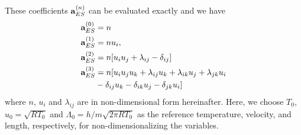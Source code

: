 \documentclass[doublecol]{epl2}
\begin{document}
These coefficients ${\bf a}^{(n)}_{ES}$ can be evaluated exactly and we have
\begin{subequations}
\begin{align}
{\bf a}_{ES}^{(0)} &= n \\ %
{\bf a}_{ES}^{(1)} &= n u_{i},  \\
{\bf a}_{ES}^{(2)} &= n [u_{i} u_{j} + \lambda_{i j} - \delta_{i j}] \\
{\bf a}_{ES}^{(3)} &= n [u_{i} u_{j} u_{k} + \lambda_{i j} u_{k} + \lambda_{i k} u_{j} + \lambda_{j k} u_{i} \nonumber \\																				 & - \delta_{i j} u_{k}  - \delta_{i k} u_{j}  - \delta_{j k} u_{i} ]
\end{align}
\end{subequations}
where $n$, $u_{i}$ and $\lambda_{i j}$ are in non-dimensional form hereinafter.  Here, we choose $T_0$, $u_0=\sqrt{ RT_0}$ and $\Lambda_0=h/m\sqrt{2\pi RT_0}$ as the reference temperature, velocity, and length, respectively, for non-dimensionalizing the variables.
\end{document}
